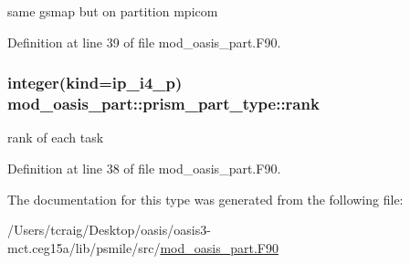 same gsmap but on partition mpicom 



Definition at line 39 of file mod\+\_\+oasis\+\_\+part.\+F90.

\hypertarget{structmod__oasis__part_1_1prism__part__type_a1bf56b7dcc55c07cab5d1be13d33cfdd}{
\subsubsection[{rank}]{\setlength{\rightskip}{0pt plus 5cm}integer(kind=ip\+\_\+i4\+\_\+p) mod\+\_\+oasis\+\_\+part\+::prism\+\_\+part\+\_\+type\+::rank\hspace{0.3cm}{\ttfamily [private]}}}\label{structmod__oasis__part_1_1prism__part__type_a1bf56b7dcc55c07cab5d1be13d33cfdd}


rank of each task 



Definition at line 38 of file mod\+\_\+oasis\+\_\+part.\+F90.



The documentation for this type was generated from the following file\+:\begin{DoxyCompactItemize}
\item 
/\+Users/tcraig/\+Desktop/oasis/oasis3-\/mct.\+ceg15a/lib/psmile/src/\hyperlink{mod__oasis__part_8_f90}{mod\+\_\+oasis\+\_\+part.\+F90}\end{DoxyCompactItemize}
